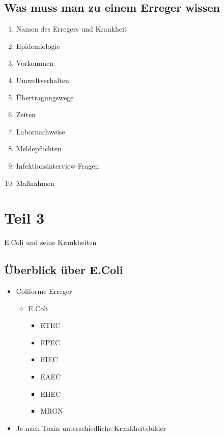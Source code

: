 \documentclass[
]{article}
\providecommand{\tightlist}{%
  \setlength{\itemsep}{0pt}\setlength{\parskip}{0pt}}
\begin{document}
\hypertarget{was-muss-man-zu-einem-erreger-wissen}{%
\subsection{Was muss man zu einem Erreger
wissen}\label{was-muss-man-zu-einem-erreger-wissen}}

\begin{enumerate}
\def\labelenumi{\arabic{enumi}.}
\tightlist
\item
  Namen des Erregers und Krankheit
\item
  Epidemiologie
\item
  Vorkommen
\item
  Umweltverhalten
\item
  Übertragungswege
\item
  Zeiten
\item
  Labornachweise
\item
  Meldepflichten
\item
  Infektionsinterview-Fragen
\item
  Maßnahmen
\end{enumerate}

\hypertarget{teil-3}{%
\section{Teil 3}\label{teil-3}}

E.Coli und seine Krankheiten

\hypertarget{uxfcberblick-uxfcber-e.coli}{%
\subsection{Überblick über E.Coli}\label{uxfcberblick-uxfcber-e.coli}}

\begin{itemize}
\tightlist
\item
  Coliforme Erreger

  \begin{itemize}
  \tightlist
  \item
    E.Coli

    \begin{itemize}
    \tightlist
    \item
      ETEC
    \item
      EPEC
    \item
      EIEC
    \item
      EAEC
    \item
      EHEC
    \item
      MRGN
    \end{itemize}
  \end{itemize}
\item
  Je nach Toxin unterschiedliche Krankheitsbilder
\end{itemize}
\end{document}
